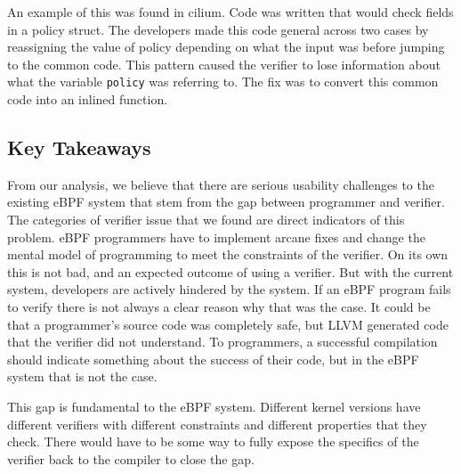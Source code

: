 An example of this was found in cilium.
Code was written that would check fields in a policy struct.
The developers made this code general across two cases by reassigning the value of policy depending on what the input was before jumping to the common code.
This pattern caused the verifier to lose information about what the variable \verb{policy{ was referring to.
The fix was to convert this common code into an inlined function.

\subsection{Key Takeaways}
From our analysis, we believe that there are serious usability challenges to the existing eBPF system that stem from the gap between programmer and verifier.
The categories of verifier issue that we found are direct indicators of this problem.
eBPF programmers have to implement arcane fixes and change the mental model of programming to meet the constraints of the verifier.
On its own this is not bad, and an expected outcome of using a verifier.
But with the current system, developers are actively hindered by the system.
If an eBPF program fails to verify there is not always a clear reason why that was the case.
It could be that a programmer's source code was completely safe, but LLVM generated code that the verifier did not understand.
To programmers, a successful compilation should indicate something about the success of their code, but in the eBPF system that is not the case.

This gap is fundamental to the eBPF system.
Different kernel versions have different verifiers with different constraints and different properties that they check.
There would have to be some way to fully expose the specifics of the verifier back to the compiler to close the gap.
